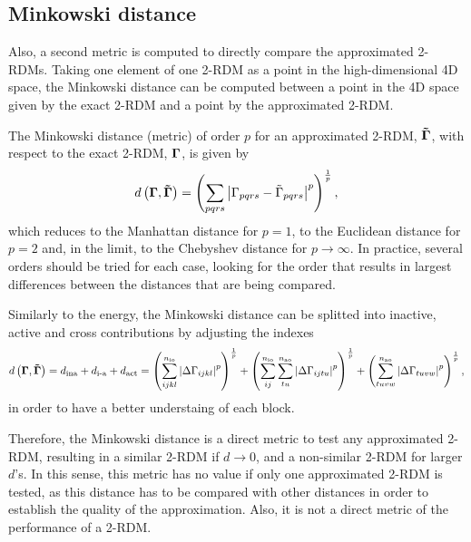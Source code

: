 \subsection{Minkowski distance}
Also, a second metric is computed to directly compare the approximated 2-RDMs.
Taking one element of one 2-RDM as a point in the high-dimensional 4D space,
the Minkowski distance can be computed between a point in the 4D space given by the
exact 2-RDM and a point by the approximated 2-RDM.

The Minkowski distance (metric) of order $p$ for an approximated 2-RDM,
$ \boldsymbol{\mathrm{\tilde{\Gamma}}}$, with respect to the exact 2-RDM, $ \boldsymbol{\mathrm{\Gamma}}$,
is given by 
\begin{equation} \label{eq:minkowski-distance}
    d \left( \boldsymbol{\mathrm{\Gamma}} , \boldsymbol{\mathrm{\tilde{\Gamma}}} \right) =
    \left(
        \sum_{pqrs} \left| \Gamma_{pqrs} - \tilde{\Gamma}_{pqrs} \right|^p
    \right)^{\frac{1}{p}}
    ,
\end{equation}
which reduces to the Manhattan distance for $p=1$, to the Euclidean distance
for $p=2$ and, in the limit, to the Chebyshev distance for $p \to \infty$.
In practice, several orders should be tried for each case, looking for the
order that results in largest differences between the distances that are
being compared.

Similarly to the energy, the Minkowski distance can be splitted into
inactive, active and cross contributions by adjusting the indexes 
\begin{equation}
    d \left( \boldsymbol{\mathrm{\Gamma}} , \boldsymbol{\mathrm{\tilde{\Gamma}}} \right) =
    d_{\text{ina}} + d_{\text{i-a}} + d_{\text{act}} =
    \left(
        \sum_{ijkl}^{n_{\text{io}}} \left| \Delta \Gamma_{ijkl} \right|^p
    \right)^{\frac{1}{p}}
    +
    \left(
        \sum_{ij}^{n_{\text{io}}} \sum_{tu}^{n_{\text{ao}}} \left| \Delta \Gamma_{ijtu} \right|^p
    \right)^{\frac{1}{p}}
    +
    \left(
        \sum_{tuvw}^{n_{\text{ao}}} \left| \Delta \Gamma_{tuvw} \right|^p
    \right)^{\frac{1}{p}}
    ,
\end{equation}
in order to have a better understaing of each block.

Therefore, the Minkowski distance is a direct metric to test any approximated
2-RDM, resulting in a similar 2-RDM if $d \to 0$, and a non-similar 2-RDM
for larger $d$'s.
In this sense, this metric has no value if only one approximated 2-RDM is tested,
as this distance has to be compared with other distances in order to establish
the quality of the approximation.
Also, it is not a direct metric of the performance of a 2-RDM.

